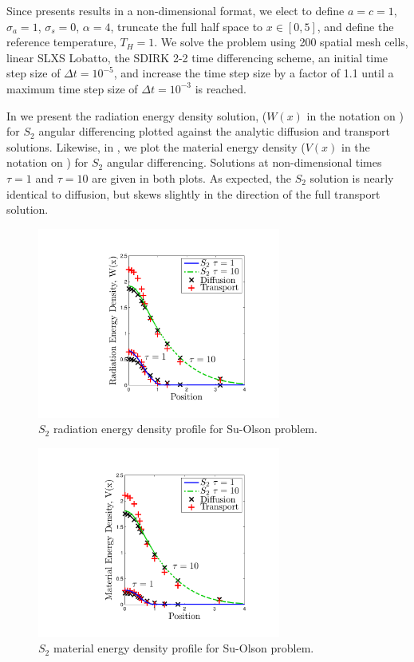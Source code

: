 Since \cite{su_olson_1} presents results in a non-dimensional format, we elect to define $a=c=1$, $\sigma_a = 1$, $\sigma_s=0$, $\alpha = 4$, truncate the full half space to $x\in[0,5]$, and define the reference temperature, $T_H = 1$.
We solve the problem using 200 spatial mesh cells, linear SLXS Lobatto, the SDIRK 2-2 time differencing scheme, an initial time step size of $\Delta t = 10^{-5}$, and increase the time step size by a factor of 1.1 until a maximum time step size of $\Delta t = 10^{-3}$ is reached.

In  we present the radiation energy density solution, ($W(x)$ in the notation on \cite{su_olson_1}) for $S_2$ angular differencing plotted against the analytic diffusion and transport solutions.  Likewise, in , we plot the material energy density ($V(x)$ in the notation on \cite{su_olson_1}) for $S_2$ angular differencing.
Solutions at non-dimensional times $\tau = 1$ and $\tau=10$ are given in both plots.
As expected, the $S_2$ solution is nearly identical to diffusion, but skews slightly in the direction of the full transport solution.
\begin{figure}[!htp]
\centering
\includegraphics[width=8cm,trim=1.75in  0.5in 0.75in 0.5in,clip=true]{chapter6_grey_radtran/Dissertation_Data/Su_Olson_S2_Radiation_Energy.pdf}
\caption{$S_2$ radiation energy density profile for Su-Olson problem.}
\label{fig:su_olson_s2_rad}
\end{figure}
\begin{figure}[!hbp]
\centering
\includegraphics[width=8cm,trim=1.75in  0.5in 0.75in 0.5in,clip=true]{chapter6_grey_radtran/Dissertation_Data/Su_Olson_S2_Material_Energy.pdf}
\caption{$S_2$ material energy density profile for Su-Olson problem.}
\label{fig:su_olson_s2_mat}
\end{figure}

